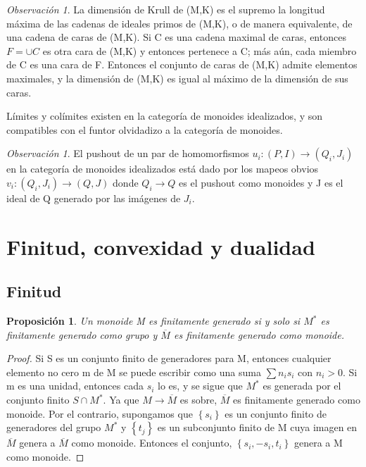 \documentclass[12pt,spanish]{amsart}
\newcommand{\set}[1]{\left\{{#1}\right\}}
\newtheorem{prop}[Theorem]{Proposición}
\theoremstyle{definition}
\theoremstyle{remark}
\newtheorem{obs}[Theorem]{Observación}
\begin{document}
\begin{obs}
La dimensión de Krull de (M,K) es el supremo la longitud máxima de las cadenas de ideales primos de (M,K), o de manera equivalente, de una cadena de caras de (M,K). Si C es una cadena maximal de caras, entonces $F=\cup C$ es otra cara de (M,K) y entonces pertenece a C; más aún, cada miembro de C es una cara de F. Entonces el conjunto de caras de (M,K) admite elementos maximales, y la dimensión de (M,K) es igual al máximo de la dimensión de sus caras. 
\end{obs}

Límites y colímites existen en la categoría de monoides idealizados, y son compatibles con el funtor olvidadizo a la categoría de monoides. 

\begin{obs}
El pushout de un par de homomorfismos $u_{i}:(P,I) \to (Q_{i},J_{i})$ en la categoría de monoides idealizados está dado por los mapeos obvios $v_{i}:(Q_{i},J_{i}) \to (Q,J)$ donde $Q_{i} \to Q$ es el pushout como monoides y J es el ideal de Q generado por las imágenes de $J_{i}$. 
\end{obs}

\section{Finitud, convexidad y dualidad}

\subsection{Finitud}
\begin{prop}
Un monoide M es finitamente generado si y solo si $M^{\ast}$ es finitamente generado como grupo y $\overline{M}$ es finitamente generado como monoide. 
\end{prop}

\begin{proof}
Si S es un conjunto finito de generadores para M, entonces cualquier elemento no cero m de M se puede escribir como una suma $\sum n_{i} s_{i}$ con $n_{i}>0$. Si m es una unidad, entonces cada $s_{i}$ lo es, y se sigue que $M^{\ast}$ es generada por el conjunto finito $S \cap M^{\ast}$. Ya que $M\to \overline{M}$ es sobre, $\overline{M}$ es finitamente generado como monoide. Por el contrario, supongamos que $\set{s_{i}}$ es un conjunto finito de generadores del grupo $M^{\ast}$ y $\set{t_{j}}$ es un subconjunto finito de M cuya imagen en $\overline{M}$ genera a $\overline{M}$ como monoide. Entonces el conjunto, $\set{s_{i},-s_{i},t_{i}}$ genera a M como monoide.    
\end{proof}
\end{document}
